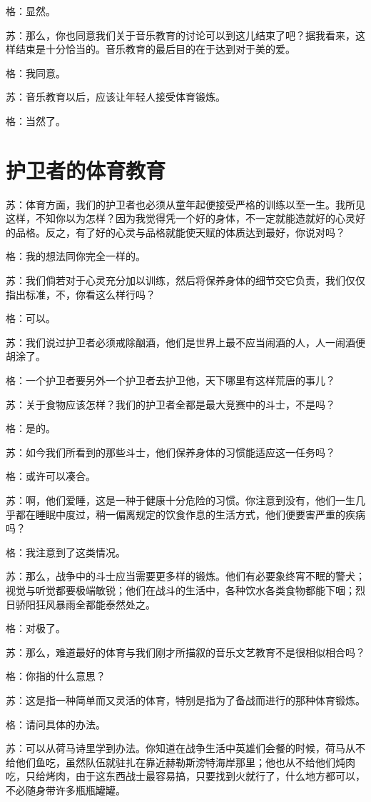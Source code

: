\documentclass[11pt,oneside]{book}
\begin{document}
\begin{common-format}
格：显然。

苏：那么，你也同意我们关于音乐教育的讨论可以到这儿结束了吧？据我看来，这样结束是十分恰当的。音乐教育的最后目的在于达到对于美的爱。

格：我同意。

苏：音乐教育以后，应该让年轻人接受体育锻炼。

格：当然了。


\section{护卫者的体育教育}
苏：体育方面，我们的护卫者也必须从童年起便接受严格的训练以至一生。我所见这样，不知你以为怎样？因为我觉得凭一个好的身体，不一定就能造就好的心灵好的品格。反之，有了好的心灵与品格就能使天赋的体质达到最好，你说对吗？

格：我的想法同你完全一样的。

苏：我们倘若对于心灵充分加以训练，然后将保养身体的细节交它负责，我们仅仅指出标准，不，你看这么样行吗？

格：可以。

苏：我们说过护卫者必须戒除酗酒，他们是世界上最不应当闹酒的人，人一闹酒便胡涂了。

格：一个护卫者要另外一个护卫者去护卫他，天下哪里有这样荒唐的事儿？

苏：关于食物应该怎样？我们的护卫者全都是最大竞赛中的斗士，不是吗？

格：是的。

苏：如今我们所看到的那些斗士，他们保养身体的习惯能适应这一任务吗？

格：或许可以凑合。

苏：啊，他们爱睡，这是一种于健康十分危险的习惯。你注意到没有，他们一生几乎都在睡眠中度过，稍一偏离规定的饮食作息的生活方式，他们便要害严重的疾病吗？

格：我注意到了这类情况。

苏：那么，战争中的斗士应当需要更多样的锻炼。他们有必要象终宵不眠的警犬；视觉与听觉都要极端敏锐；他们在战斗的生活中，各种饮水各类食物都能下咽；烈日骄阳狂风暴雨全都能泰然处之。

格：对极了。

苏：那么，难道最好的体育与我们刚才所描叙的音乐文艺教育不是很相似相合吗？

格：你指的什么意思？

苏：这是指一种简单而又灵活的体育，特别是指为了备战而进行的那种体育锻炼。
  
格：请问具体的办法。

苏：可以从荷马诗里学到办法。你知道在战争生活中英雄们会餐的时候，荷马从不给他们鱼吃，虽然队伍就驻扎在靠近赫勒斯滂特海岸那里；他也从不给他们炖肉吃，只给烤肉，由于这东西战士最容易搞，只要找到火就行了，什么地方都可以，不必随身带许多瓶瓶罐罐。


\end{common-format}
\end{document}
